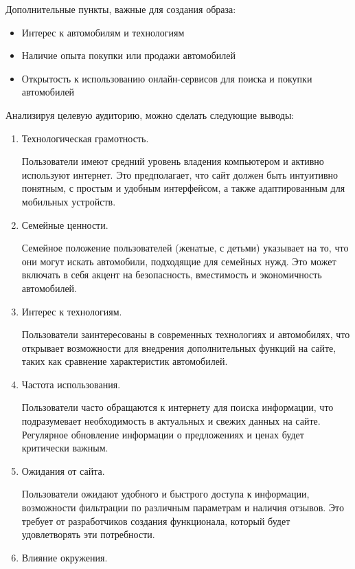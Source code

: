 Дополнительные пункты, важные для создания образа:
\begin{itemize}
    \item Интерес к автомобилям и технологиям
    \item Наличие опыта покупки или продажи автомобилей
    \item Открытость к использованию онлайн-сервисов для поиска и покупки автомобилей
\end{itemize}
\bigskip

Анализируя целевую аудиторию, можно сделать следующие выводы:
\begin{enumerate}
    \item Технологическая грамотность.

    Пользователи имеют средний уровень владения компьютером и активно используют интернет. Это предполагает, что сайт должен быть интуитивно понятным, с простым и удобным интерфейсом, а также адаптированным для мобильных устройств.

    \item Семейные ценности.

    Семейное положение пользователей (женатые, с детьми) указывает на то, что они могут искать автомобили, подходящие для семейных нужд. Это может включать в себя акцент на безопасность, вместимость и экономичность автомобилей.

    \item Интерес к технологиям.

    Пользователи заинтересованы в современных технологиях и автомобилях, что открывает возможности для внедрения дополнительных функций на сайте, таких как сравнение характеристик автомобилей.

    \item Частота использования.

    Пользователи часто обращаются к интернету для поиска информации, что подразумевает необходимость в актуальных и свежих данных на сайте. Регулярное обновление информации о предложениях и ценах будет критически важным.

    \item Ожидания от сайта.

    Пользователи ожидают удобного и быстрого доступа к информации, возможности фильтрации по различным параметрам и наличия отзывов. Это требует от разработчиков создания функционала, который будет удовлетворять эти потребности.

    \item Влияние окружения.


\end{enumerate}
